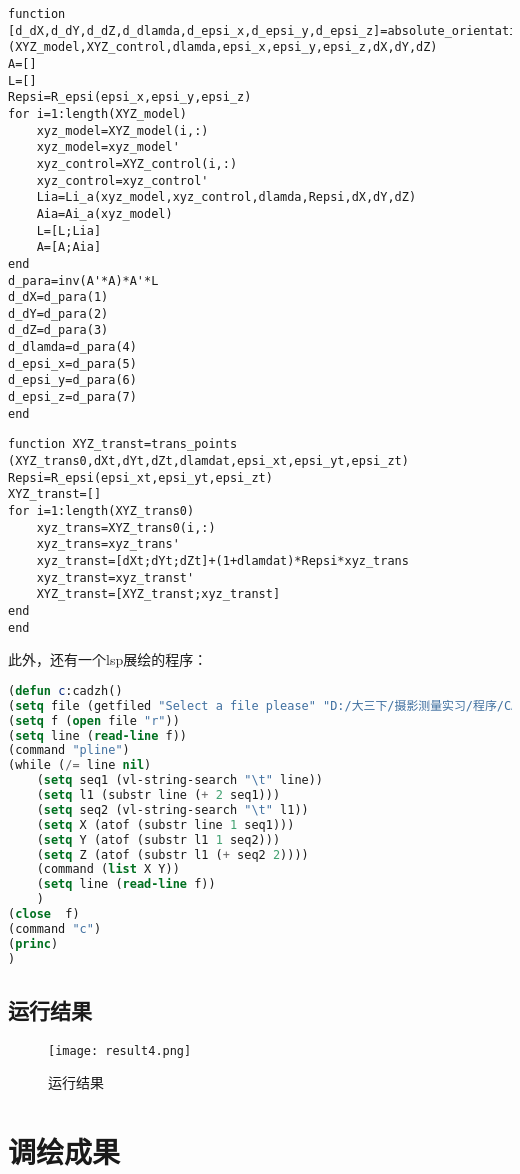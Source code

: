 \begin{lstlisting}[caption=absolute\_orientation.m]
function [d_dX,d_dY,d_dZ,d_dlamda,d_epsi_x,d_epsi_y,d_epsi_z]=absolute_orientation
(XYZ_model,XYZ_control,dlamda,epsi_x,epsi_y,epsi_z,dX,dY,dZ)
A=[]
L=[]
Repsi=R_epsi(epsi_x,epsi_y,epsi_z)
for i=1:length(XYZ_model)
    xyz_model=XYZ_model(i,:)
    xyz_model=xyz_model'
    xyz_control=XYZ_control(i,:)
    xyz_control=xyz_control'
    Lia=Li_a(xyz_model,xyz_control,dlamda,Repsi,dX,dY,dZ)
    Aia=Ai_a(xyz_model)
    L=[L;Lia]
    A=[A;Aia]
end
d_para=inv(A'*A)*A'*L
d_dX=d_para(1)
d_dY=d_para(2)
d_dZ=d_para(3)
d_dlamda=d_para(4)
d_epsi_x=d_para(5)
d_epsi_y=d_para(6)
d_epsi_z=d_para(7)
end
\end{lstlisting}

\begin{lstlisting}[caption=trans\_points.m]
function XYZ_transt=trans_points
(XYZ_trans0,dXt,dYt,dZt,dlamdat,epsi_xt,epsi_yt,epsi_zt)
Repsi=R_epsi(epsi_xt,epsi_yt,epsi_zt)
XYZ_transt=[]
for i=1:length(XYZ_trans0)
    xyz_trans=XYZ_trans0(i,:)
    xyz_trans=xyz_trans'
    xyz_transt=[dXt;dYt;dZt]+(1+dlamdat)*Repsi*xyz_trans
    xyz_transt=xyz_transt'
    XYZ_transt=[XYZ_transt;xyz_transt]
end
end
\end{lstlisting}

此外，还有一个lsp展绘的程序：

\begin{lstlisting}[language=Lisp,caption=cadzd.lsp]
(defun c:cadzh()
(setq file (getfiled "Select a file please" "D:/大三下/摄影测量实习/程序/CAD展绘/大礼堂绝对定向结果.txt" "txt" 0))
(setq f (open file "r"))
(setq line (read-line f))
(command "pline")
(while (/= line nil)
    (setq seq1 (vl-string-search "\t" line))
    (setq l1 (substr line (+ 2 seq1)))
    (setq seq2 (vl-string-search "\t" l1))
    (setq X (atof (substr line 1 seq1)))
    (setq Y (atof (substr l1 1 seq2)))
    (setq Z (atof (substr l1 (+ seq2 2))))
    (command (list X Y))
    (setq line (read-line f))
    )
(close  f)
(command "c")
(princ)
)
\end{lstlisting}

\subsection{运行结果}

\begin{figure}[htbp]
\caption{运行结果}
\centering
\texttt{[image: result4.png]}
\end{figure}

\section{调绘成果}

